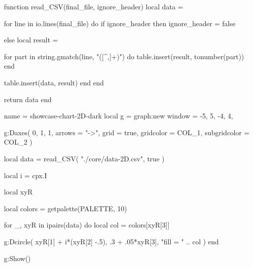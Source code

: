 
\vfill

\begin{luacode*}
function read_CSV(final_file, ignore_header)
  local data = {}

  for line in io.lines(final_file) do
    if ignore_header then
      ignore_header = false

    else
      local result = {}

      for part in string.gmatch(line, "([^,]+)") do
        table.insert(result, tonumber(part))
      end

      table.insert(data, result)
    end
  end

  return data
end
\end{luacode*}


\begin{luadraw}{name = showcase-chart-2D-dark}
local g = graph:new{
  window = {-5, 5, -4, 4},
}

g:Daxes(
  {0, 1, 1},
  {
    arrows       = "->",
    grid         = true,
    gridcolor    = COL_1,
    subgridcolor = COL_2
  }
)

local data = read_CSV(
  "./core/data-2D.csv",
  true
)

local i = cpx.I

local xyR

local colors = getpalette(PALETTE, 10)

for _, xyR in ipairs(data) do
  local col = colors[xyR[3]]

  g:Dcircle(
    xyR[1] + i*(xyR[2] -.5), .3 + .05*xyR[3],
    "fill = " .. col
  )
end

g:Show()
\end{luadraw}
